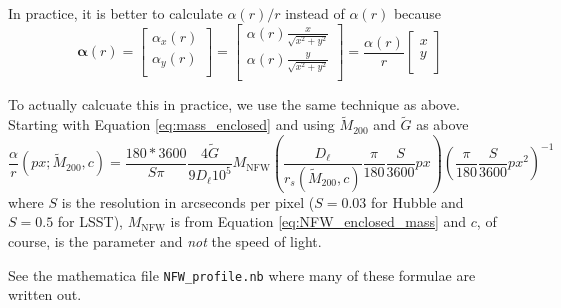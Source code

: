 \documentclass[10pt,twoside]{article}
\theoremstyle{definition}
\theoremstyle{exercise}
\renewcommand{\v}[1]{\boldsymbol{#1}}%
\begin{document}
In practice, it is better to calculate $\alpha(r)/r$ instead of $\alpha(r)$ because
\begin{equation}
		\v{\alpha}(r) = \begin{bmatrix}
\alpha_x(r)\\
\alpha_y(r)\\
		\end{bmatrix}
		=
 \begin{bmatrix}
		 \alpha(r) \frac{x}{\sqrt{x^2+y^2}}\\
		 \alpha(r) \frac{y}{\sqrt{x^2+y^2}}\\
 \end{bmatrix}
 = 
 \frac{\alpha(r)}{r}
	\begin{bmatrix}
			x\\
			y\\
		  \end{bmatrix}
		\label{eq:alpha_r_components}
\end{equation}

To actually calcuate this in practice, we use the same technique as above. Starting with Equation \eqref{eq:mass_enclosed} and using $\tilde{M}_{200}$ and $\tilde{G}$ as above
\begin{equation}
		\frac{\alpha}{r}(px; \tilde{M}_{200}, c) = \frac{180*3600}{S \pi} \frac{4 \tilde{G}}{9 D_\ell 10^5} M_\text{NFW}\left( \frac{D_\ell}{r_s(\tilde{M}_{200},c)}\frac{\pi}{180} \frac{S}{3600} px \right) \left(  \frac{\pi}{180} \frac{S}{3600} px^2 \right)^{-1} 
		\label{eq:alpha_as_calculated}
\end{equation}
where $S$ is the resolution in arcseconds per pixel ($S=0.03$ for Hubble and $S=0.5$ for LSST), $M_\text{NFW}$ is from Equation \eqref{eq:NFW_enclosed_mass} and $c$, of course, is the parameter and \emph{not} the speed of light.

See the mathematica file \texttt{NFW\_profile.nb} where many of these formulae are written out.



\end{document}
